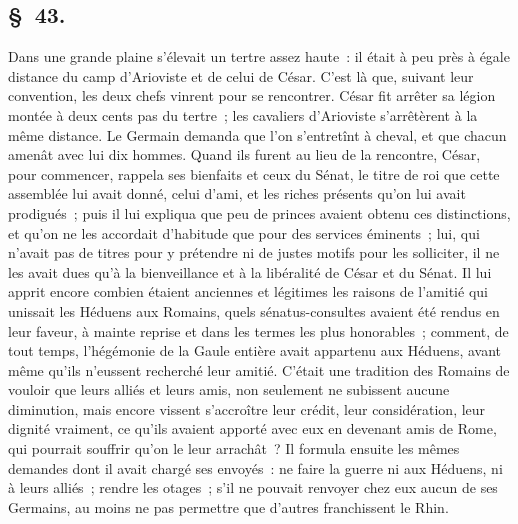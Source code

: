 \documentclass[french,twoside]{book} %
\begin{document}
\subsection[{§ 43.}]{ \textsc{§ 43.} }
\noindent Dans une grande plaine s’élevait un tertre assez haute : il était à peu près à égale distance du camp d’Arioviste et de celui de César. C'est là que, suivant leur convention, les deux chefs vinrent pour se rencontrer. César fit arrêter sa légion montée à deux cents pas du tertre ; les cavaliers d’Arioviste s’arrêtèrent à la même distance. Le Germain demanda que l’on s’entretînt à cheval, et que chacun amenât avec lui dix hommes. Quand ils furent au lieu de la rencontre, César, pour commencer, rappela ses bienfaits et ceux du Sénat, le titre de roi que cette assemblée lui avait donné, celui d’ami, et les riches présents qu’on lui avait prodigués ; puis il lui expliqua que peu de princes avaient obtenu ces distinctions, et qu’on ne les accordait d’habitude que pour des services éminents ; lui, qui n’avait pas de titres pour y prétendre ni de justes motifs pour les solliciter, il ne les avait dues qu’à la bienveillance et à la libéralité de César et du Sénat. Il lui apprit encore combien étaient anciennes et légitimes les raisons de l’amitié qui unissait les Héduens aux Romains, quels sénatus-consultes avaient été rendus en leur faveur, à mainte reprise et dans les termes les plus honorables ; comment, de tout temps, l’hégémonie de la Gaule entière avait appartenu aux Héduens, avant même qu’ils n’eussent recherché leur amitié. C'était une tradition des Romains de vouloir que leurs alliés et leurs amis, non seulement ne subissent aucune diminution, mais encore vissent s’accroître leur crédit, leur considération, leur dignité vraiment, ce qu’ils avaient apporté avec eux en devenant amis de Rome, qui pourrait souffrir qu’on le leur arrachât ? Il formula ensuite les mêmes demandes dont il avait chargé ses envoyés : ne faire la guerre ni aux Héduens, ni à leurs alliés ; rendre les otages ; s’il ne pouvait renvoyer chez eux aucun de ses Germains, au moins ne pas permettre que d’autres franchissent le Rhin.
\end{document}
